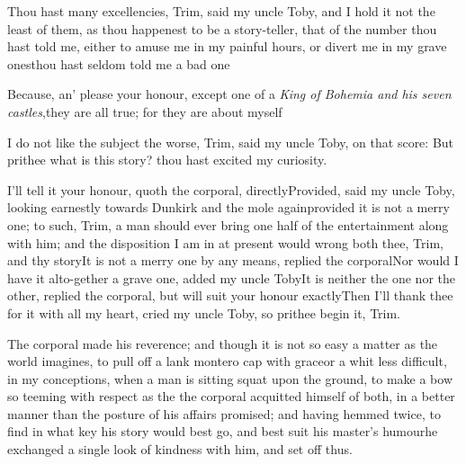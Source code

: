 \documentclass{article}
\begin{document}
\tsh Thou hast many excellencies, Trim, said my
uncle Toby, and I hold it not the least of them, as thou
happenest to be a story-teller, that of the number thou hast told me, either to amuse me in my
painful hours, or divert me in my grave ones\tsk thou hast seldom
told me a bad one\tsh

\tsh Because, an’ please your honour, except one
of a \textit{King of Bohemia and his seven castles},\tsk they are
all true; for they are about myself\tsh

I do not like the subject the worse, Trim, said my uncle
Toby, on that\break
score: But prithee what is this story?\break
thou hast excited my curiosity.

I’ll tell it your honour, quoth the corporal,
directly\tsh Provided, said my uncle Toby, looking
earnestly towards Dun\-kirk and the mole
again\tsh provided it is not a merry one; to such,
Trim, a man should ever bring one half of the entertainment
along with him; and the disposition I am in at present would wrong
both thee, Trim, and thy story\tsk It is\break
not a merry one by any means, replied the corporal\tsk Nor would
I have it alto-\break gether a grave one, added my uncle Toby\tsh It
is neither the one nor the other, replied the corporal, but will
suit your honour exactly\tsh Then I’ll thank thee for it with
all my heart, cried my uncle Toby, so prithee begin it, Trim.

The corporal made his reverence;\break
and though it is not so easy a
matter as the world imagines, to pull off a lank montero cap
with grace\tsk or a whit less difficult, in my
conceptions, when a man is sitting squat upon the ground, to make
a bow so teeming with respect as the 
\tsh the corporal acquitted himself of both, in a
better manner than the posture of his affairs promised; and having
hemmed twice, to find in what key his story would best go, and best
suit his master’s humour\tsk he exchanged a single
look of kindness with him, and set off thus.\etp{}
\end{document}
